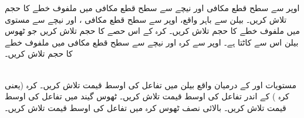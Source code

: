 اوپر سے سطح قطع مکافی  اور نیچے سے سطح قطع مکافی  میں ملفوف خطے کا حجم تلاش کریں۔
 بیلن  سے باہر واقع،   اوپر سے سطح قطع مکافی  ، اور  نیچے سے مستوی  میں ملفوف    خطے  کا حجم تلاش کریں۔
  کرہ  کے اس حصے کا  حجم تلاش کریں جو ٹھوس بیلن   اس سے کاٹتا ہے۔
اوپر سے کرہ  اور نیچے سے سطح قطع مکافی  میں ملفوف خطے کا حجم تلاش کریں۔

\\

مستویات  اور  کے درمیان واقع بیلن   میں تفاعل  کی اوسط قیمت    تلاش کریں۔
کرہ  (یعنی کرہ )  کے اندر  تفاعل  کی اوسط قیمت تلاش کریں۔
ٹھوس گیند   میں تفاعل  کی اوسط قیمت تلاش کریں۔
بالائی نصف ٹھوس کرہ   میں تفاعل  کی اوسط قیمت تلاش کریں۔

